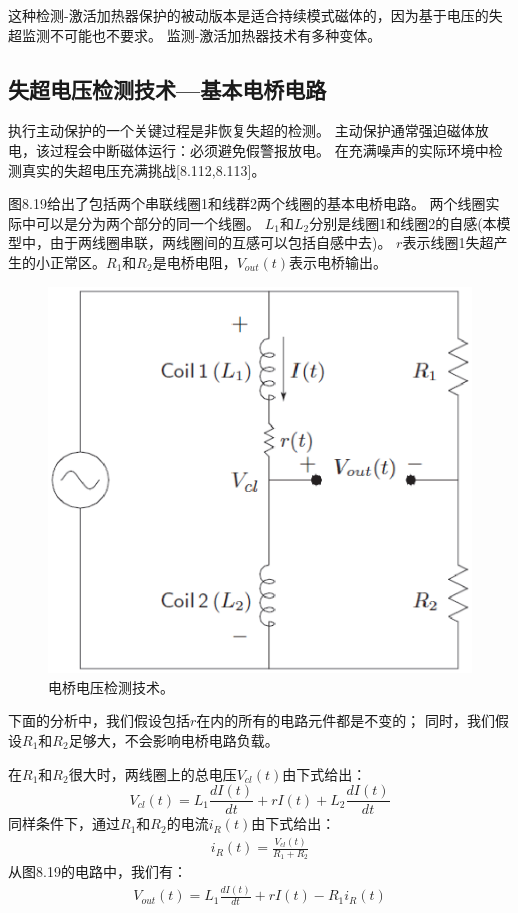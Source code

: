 这种检测-激活加热器保护的被动版本是适合持续模式磁体的，因为基于电压的失超监测不可能也不要求。
监测-激活加热器技术有多种变体。



\subsection{失超电压检测技术---基本电桥电路}
执行主动保护的一个关键过程是非恢复失超的检测。
主动保护通常强迫磁体放电，该过程会中断磁体运行：必须避免假警报放电。
在充满噪声的实际环境中检测真实的失超电压充满挑战[8.112,8.113]。

图8.19给出了包括两个串联线圈1和线群2两个线圈的基本电桥电路。
两个线圈实际中可以是分为两个部分的同一个线圈。
$L_1$和$L_2$分别是线圈1和线圈2的自感(本模型中，由于两线圈串联，两线圈间的互感可以包括自感中去)。
$r$表示线圈1失超产生的小正常区。$R_1$和$R_2$是电桥电阻，$V_{out}(t)$表示电桥输出。

\begin{figure}
	\centering
	\includegraphics[scale=0.5]{chpt8/figs/fig8.19.eps}
	\caption{电桥电压检测技术。}
\end{figure}

下面的分析中，我们假设包括$r$在内的所有的电路元件都是不变的；
同时，我们假设$R_1$和$R_2$足够大，不会影响电桥电路负载。

在$R_1$和$R_2$很大时，两线圈上的总电压$V_{cl}(t)$由下式给出：
\begin{equation}%
V_{cl}(t)=L_1\frac{dI(t)}{dt}+rI(t)+L_2\frac{dI(t)}{dt}
\end{equation}
同样条件下，通过$R_1$和$R_2$的电流$i_R(t)$由下式给出：
\begin{align*}%
i_R(t)=\frac{V_{cl}(t)}{R_1+R_2} \tag{8.66b}
\end{align*}
从图8.19的电路中，我们有：
\begin{align*}%
V_{out}(t)=L_1\frac{dI(t)}{dt}+rI(t)-R_1i_R(t) \tag{8.66c}
\end{align*}

